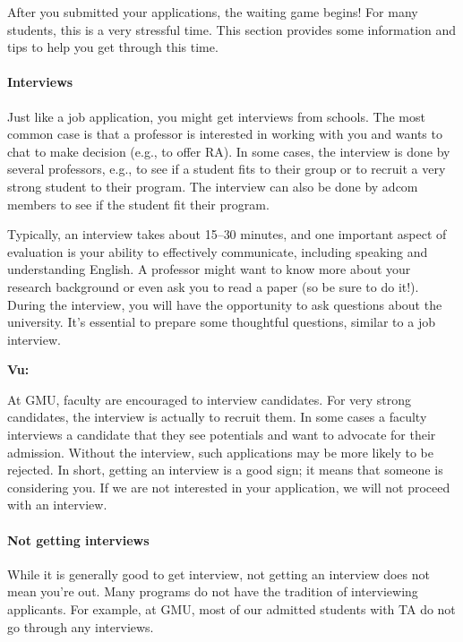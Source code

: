\documentclass[oneside,11pt]{memoir}
\newenvironment{commentbox}[1][]{
  \small
  \begin{mybox}
    {\small \textbf{#1}}
  }{
  \end{mybox}
}
\begin{document}
After you submitted your applications, the waiting game begins! For many students, this is a very stressful time. This section provides some information and tips to help you get through this time.

\paragraph{Interviews} Just like a job application, you might get interviews from schools. The most common case is that a professor is interested in working with you and wants to chat to make decision (e.g., to offer RA). In some cases, the interview is done by several professors, e.g., to see if a student fits to their group or to recruit a very strong student to their program. The interview can also be done by adcom members to see if the student fit their program.

Typically, an interview takes about 15--30 minutes, and one important aspect of evaluation is your ability to effectively communicate, including speaking and understanding English. A professor might want to know more about your research background or even ask you to read a paper (so be sure to do it!). During the interview, you will have the opportunity to ask questions about the university. It's essential to prepare some thoughtful questions, similar to a job interview.

\begin{commentbox}[Vu:]
  At GMU, faculty are encouraged to interview candidates. For very strong candidates, the interview is actually to recruit them.  In some cases a faculty interviews a candidate that they see potentials and want to advocate for their admission. Without the interview, such applications may be more likely to be rejected.
  \tcblower
  In short, getting an interview is a good sign; it means that someone is considering you. If we are not interested in your application, we will not proceed with an interview.
\end{commentbox}

\paragraph{Not getting interviews} While it is generally good to get interview, not getting an interview does not mean you're out.  Many programs do not have the tradition of interviewing applicants. For example, at GMU, most of our admitted students with TA do not go through any interviews. 
\end{document}
